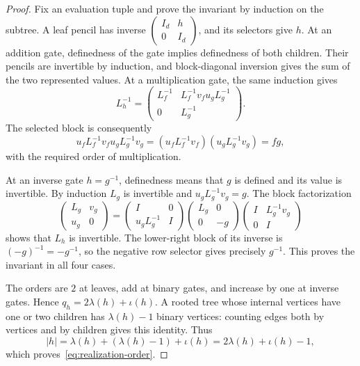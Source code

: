 \begin{proof}
Fix an evaluation tuple and prove the invariant by induction on the
subtree.  A leaf pencil has inverse
$\left(\begin{smallmatrix}I_d&h\\0&I_d\end{smallmatrix}\right)$, and its selectors
give $h$.  At an addition gate, definedness of the gate implies
definedness of both children.  Their pencils are invertible by induction,
and block-diagonal inversion gives the sum of the two represented values.
At a multiplication gate, the same induction gives
\[
 L_h^{-1}=
 \begin{pmatrix}
  L_f^{-1}&L_f^{-1}v_fu_gL_g^{-1}\\
  0&L_g^{-1}
 \end{pmatrix}.
\]
The selected block is consequently
\[
 u_fL_f^{-1}v_fu_gL_g^{-1}v_g
   =(u_fL_f^{-1}v_f)(u_gL_g^{-1}v_g)=fg,
\]
with the required order of multiplication.

At an inverse gate $h=g^{-1}$, definedness means that $g$ is defined and
its value is invertible.  By induction $L_g$ is invertible and
$u_gL_g^{-1}v_g=g$.  The block factorization
\begin{equation}
 \begin{pmatrix}L_g&v_g\\u_g&0\end{pmatrix}
 =
 \begin{pmatrix}I&0\\u_gL_g^{-1}&I\end{pmatrix}
 \begin{pmatrix}L_g&0\\0&-g\end{pmatrix}
 \begin{pmatrix}I&L_g^{-1}v_g\\0&I\end{pmatrix}
 \label{eq:inverse-schur-factorization}
\end{equation}
shows that $L_h$ is invertible.  The lower-right block of its inverse is
$(-g)^{-1}=-g^{-1}$, so the negative row selector gives precisely
$g^{-1}$.  This proves the invariant in all four cases.

The orders are $2$ at leaves, add at binary gates, and increase by one
at inverse gates.  Hence $q_h=2\lambda(h)+\iota(h)$.  A rooted tree whose
internal vertices have one or two children has $\lambda(h)-1$ binary
vertices: counting edges both by vertices and by children gives this
identity.  Thus
\[
 |h|=\lambda(h)+(\lambda(h)-1)+\iota(h)
     =2\lambda(h)+\iota(h)-1,
\]
which proves~\eqref{eq:realization-order}.
\end{proof}

